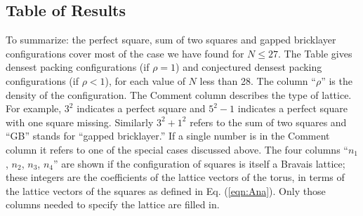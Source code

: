 \documentclass[aps]{revtex4}
\begin{document}
\subsection{Table of Results}

To summarize: the perfect square, sum of two squares and gapped bricklayer configurations cover most of the case we have found for $N \leq 27$.  The Table gives densest packing configurations (if $\rho=1$) and conjectured densest packing configurations (if $\rho<1$), for each value of  $N$ less than 28.  The column ``$\rho$'' is the density of the configuration. The Comment column describes the type of lattice.   For example, $3^2$ indicates a perfect square and $5^2-1$ indicates a perfect square with one square missing.  Similarly $3^2+1^2$ refers to the sum of two squares and ``GB'' stands for ``gapped bricklayer.''  If a single number is in the Comment column it refers to one of the special cases discussed above.  The four columns ``$n_1$, $n_2$, $n_3$, $n_4$'' are shown if the configuration of squares is itself a Bravais lattice; these integers are the coefficients of the lattice vectors of the torus, in terms of the lattice vectors of the squares as defined in Eq. (\ref{eqn:Ana}).  Only those columns needed to specify the lattice are filled in.
\end{document}
